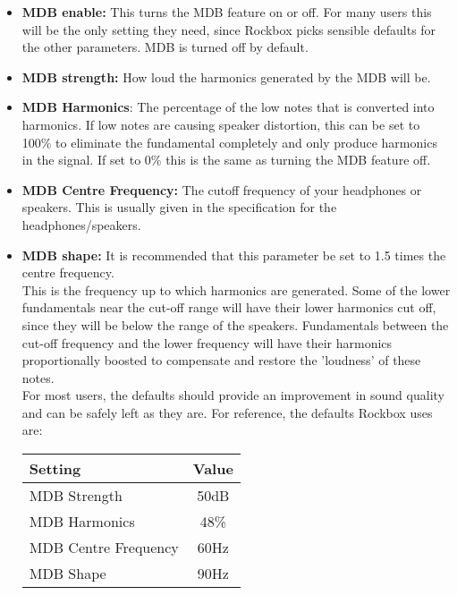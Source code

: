 \begin{itemize}
\begin{itemize}
\item \textbf{MDB enable: } This turns the MDB feature on or off.  For many
users this will be the only setting they need, since Rockbox picks
sensible defaults for the other parameters.  MDB is turned off by
default.
\item \textbf{MDB strength:} How loud the harmonics generated by the MDB will
be.
\item \textbf{MDB Harmonics}: The percentage of the low notes that is
converted into harmonics.  If low notes are causing speaker distortion,
this can be set to 100\% to eliminate the fundamental completely and
only produce harmonics in the signal.  If set to 0\% this is the same
as turning the MDB feature off.
\item \textbf{MDB Centre Frequency: }The cutoff frequency of your headphones or speakers.  This is usually given in the specification for the headphones/speakers.
\item \textbf{MDB shape: }It is recommended that this parameter be set to 1.5
times the centre frequency.\\

This is the frequency up to which harmonics are generated.  Some of the
lower fundamentals near the cut{}-off range
will have their lower harmonics cut off, since they will be below the
range of the speakers. Fundamentals between the
cut{}-off frequency and the lower frequency will have their harmonics proportionally boosted to compensate and restore the 'loudness' of these
notes.\\

For most users, the defaults should provide an improvement in sound
quality and can be safely left as they are.  For reference, the
defaults Rockbox uses are:


\begin{table}[h!]
  \begin{center}
    \begin{tabular}{@{}lc@{}}\toprule
      Setting & Value \\\midrule
      MDB Strength & 50dB \\
      MDB Harmonics & 48\% \\
      MDB Centre Frequency & 60Hz \\
      MDB Shape & 90Hz \\\bottomrule
    \end{tabular}
  \end{center}
\end{table}

\end{itemize}
\end{itemize}

